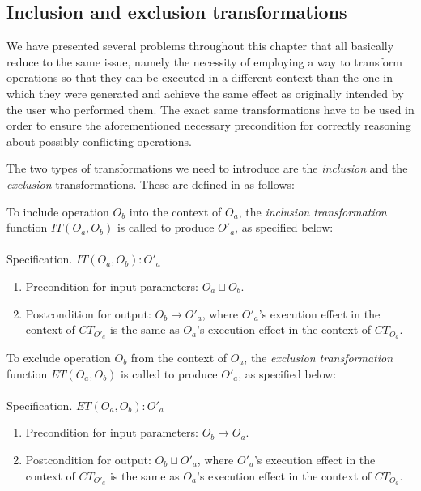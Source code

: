 \subsection{Inclusion and exclusion transformations}
\label{sec:incexcl}

We have presented several problems throughout this chapter that all basically reduce to
the same issue, namely the necessity of employing a way to transform operations so that
they can be executed in a different context than the one in which they were generated and achieve
the same effect as originally intended by the user who performed them. The exact same
transformations have to be used in order to ensure the aforementioned necessary precondition
for correctly reasoning about possibly conflicting operations.

The two types of transformations we need to introduce are the \emph{inclusion} and the
\emph{exclusion} transformations. These are defined in \cite{sun96} as follows:

\begin{defi}
To include operation $O_{b}$ into the context of $O_{a}$, the \emph{inclusion transformation}
function $IT(O_{a},O_{b})$ is called to produce $O'_{a}$, as specified below:
\\
\\
Specification. $IT(O_{a},O_{b}):O'_{a}$
\begin{enumerate}
\item Precondition for input parameters: $O_{a} \sqcup O_{b}$.
\item Postcondition for output: $O_{b} \mapsto O'_{a}$, where $O'_{a}$'s execution
      effect in the context of $CT_{O'_{a}}$ is the same as $O_{a}$'s execution effect
      in the context of $CT_{O_{a}}$.
\end{enumerate}
\end{defi}

\begin{defi}
To exclude operation $O_{b}$ from the context of $O_{a}$, the \emph{exclusion transformation}
function $ET(O_{a},O_{b})$ is called to produce $O'_{a}$, as specified below:
\\
\\
Specification. $ET(O_{a},O_{b}):O'_{a}$
\begin{enumerate}
\item Precondition for input parameters: $O_{b} \mapsto O_{a}$.
\item Postcondition for output: $O_{b} \sqcup O'_{a}$, where $O'_{a}$'s execution
      effect in the context of $CT_{O'_{a}}$ is the same as $O_{a}$'s execution
      effect in the context of $CT_{O_{a}}$.
\end{enumerate}
\end{defi}

